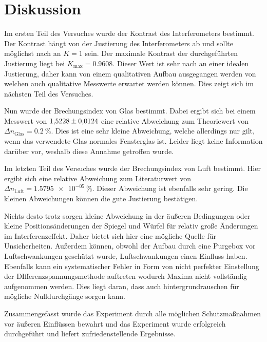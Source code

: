 \chapter{Diskussion}
\label{cha:Diskussion}
Im ersten Teil des Versuches wurde der Kontrast des Interferometers bestimmt. Der Kontrast hängt von der Justierung des Interferometers ab und sollte möglichst nach an $K = 1$ sein.
Der maximale Kontrast der durchgeführten Justierung liegt bei $K_\mathrm{max} = 0.9608$. Dieser Wert ist sehr nach an einer idealen Justierung, daher kann von einem qualitativen Aufbau
ausgegangen werden von welchen auch qualitative Messwerte erwartet werden können. Dies zeigt sich im nächsten Teil des Versuches. 

Nun wurde der Brechungsindex von Glas bestimmt. Dabei
ergibt sich bei einem Messwert von $\num{1.5228 \pm 0.0124}$ eine relative Abweichung zum Theoriewert von $\Delta n_\mathrm{Glas} = \qty{0.2}{\percent}$. Dies ist eine sehr kleine Abweichung, 
welche allerdings nur gilt, wenn das verwendete Glas normales Fensterglas ist. Leider liegt keine Information darüber vor, weshalb diese Annahme getroffen wurde.

Im letzten Teil des Versuches wurde der Brechungsindex von Luft bestimmt. Hier ergibt sich eine relative Abweichung zum Literaturwert von $\Delta n_\mathrm{Luft} = \qty{1.5795e-05}{\percent}$.
Dieser Abweichung ist ebenfalls sehr gering. Die kleinen Abweichungen können die gute Justierung bestätigen. 

Nichts desto trotz sorgen kleine Abweichung in der äußeren Bedingungen oder kleine Positionsänderungen der Spiegel und Würfel für relativ große Änderungen im Interferenzeffekt. Daher 
bietet sich hier eine mögliche Quelle für Unsicherheiten. Außerdem können, obwohl der Aufbau durch eine Purgebox vor Luftschwankungen geschützt wurde, Luftschwankungen einen Einfluss haben.
Ebenfalls kann ein systematischer Fehler in Form von nicht perfekter Einstellung der DIfferenzspannungsmethode auftreten wodurch Maxima nicht vollständig aufgenommen werden. Dies liegt 
daran, dass auch hintergrundrauschen für mögliche Nulldurchgänge sorgen kann.

Zusammengefasst wurde das Experiment durch alle möglichen Schutzmaßnahmen vor äußeren Einflüssen bewahrt und das Experiment wurde erfolgreich durchgeführt und liefert zufriedenstellende Ergebnisse. 
